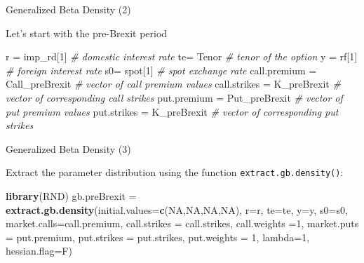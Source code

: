 \documentclass[ignorenonframetext,aspectratio=169]{beamer}
\newenvironment{Shaded}{}{}
\newcommand{\KeywordTok}[1]{\textcolor[rgb]{0.00,0.44,0.13}{\textbf{#1}}}
\newcommand{\DataTypeTok}[1]{\textcolor[rgb]{0.56,0.13,0.00}{#1}}
\newcommand{\DecValTok}[1]{\textcolor[rgb]{0.25,0.63,0.44}{#1}}
\newcommand{\StringTok}[1]{\textcolor[rgb]{0.25,0.44,0.63}{#1}}
\newcommand{\CommentTok}[1]{\textcolor[rgb]{0.38,0.63,0.69}{\textit{#1}}}
\newcommand{\OtherTok}[1]{\textcolor[rgb]{0.00,0.44,0.13}{#1}}
\newcommand{\NormalTok}[1]{#1}
\begin{document}
\begin{frame}[fragile]{Generalized Beta Density (2)}

Let's start with the pre-Brexit period

\begin{Shaded}
\begin{Highlighting}[]
\NormalTok{r =}\StringTok{ }\NormalTok{imp_rd[}\DecValTok{1}\NormalTok{]                  }\CommentTok{# domestic interest rate}
\NormalTok{te=}\StringTok{ }\NormalTok{Tenor                      }\CommentTok{# tenor of the option}
\NormalTok{y =}\StringTok{ }\NormalTok{rf[}\DecValTok{1}\NormalTok{]                      }\CommentTok{# foreign interest rate}
\NormalTok{s0=}\StringTok{ }\NormalTok{spot[}\DecValTok{1}\NormalTok{]                    }\CommentTok{# spot exchange rate}
\NormalTok{call.premium =}\StringTok{ }\NormalTok{Call_preBrexit  }\CommentTok{# vector of call premium values}
\NormalTok{call.strikes =}\StringTok{ }\NormalTok{K_preBrexit     }\CommentTok{# vector of corresponding call strikes}
\NormalTok{put.premium =}\StringTok{ }\NormalTok{Put_preBrexit    }\CommentTok{# vector of put premium values}
\NormalTok{put.strikes =}\StringTok{ }\NormalTok{K_preBrexit      }\CommentTok{# vector of corresponding put strikes}
\end{Highlighting}
\end{Shaded}

\end{frame}

\begin{frame}[fragile]{Generalized Beta Density (3)}

Extract the parameter distribution using the function
\texttt{extract.gb.density()}:

\begin{Shaded}
\begin{Highlighting}[]
\KeywordTok{library}\NormalTok{(RND)}
\NormalTok{gb.preBrexit =}\StringTok{ }\KeywordTok{extract.gb.density}\NormalTok{(}\DataTypeTok{initial.values=}\KeywordTok{c}\NormalTok{(}\OtherTok{NA}\NormalTok{,}\OtherTok{NA}\NormalTok{,}\OtherTok{NA}\NormalTok{,}\OtherTok{NA}\NormalTok{), }
                                  \DataTypeTok{r=}\NormalTok{r, }\DataTypeTok{te=}\NormalTok{te, }\DataTypeTok{y=}\NormalTok{y, }\DataTypeTok{s0=}\NormalTok{s0, }
                                  \DataTypeTok{market.calls=}\NormalTok{call.premium, }
                                  \DataTypeTok{call.strikes =}\NormalTok{ call.strikes, }
                                  \DataTypeTok{call.weights =}\DecValTok{1}\NormalTok{,}
                                  \DataTypeTok{market.puts =}\NormalTok{ put.premium, }
                                  \DataTypeTok{put.strikes =}\NormalTok{ put.strikes, }
                                  \DataTypeTok{put.weights =} \DecValTok{1}\NormalTok{,}
                                  \DataTypeTok{lambda=}\DecValTok{1}\NormalTok{, }\DataTypeTok{hessian.flag=}\NormalTok{F)}
\end{Highlighting}
\end{Shaded}

\end{frame}
\end{document}
